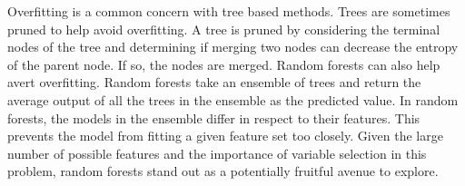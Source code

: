 \documentclass{sig-alternate-05-2015}
\begin{document}
\par{} Overfitting is a common concern with tree based methods. Trees are sometimes pruned to help avoid overfitting. A tree is pruned by considering the terminal nodes of the tree and determining if merging two nodes can decrease the entropy of the parent node. If so, the nodes are merged. Random forests can also help avert overfitting. Random forests take an ensemble of trees and return the average output of all the trees in the ensemble as the predicted value. In random forests, the models in the ensemble differ in respect to their features. This prevents the model from fitting a given feature set too closely. Given the large number of possible features and the importance of variable selection in this problem, random forests stand out as a potentially fruitful avenue to explore.
\end{document}
